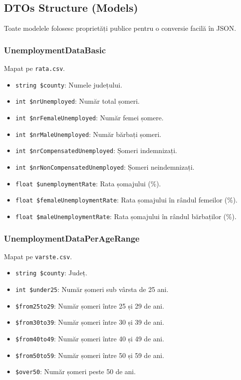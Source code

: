 \documentclass[12pt,a4paper]{article}
\begin{document}
\subsection{DTOs Structure (Models)}
Toate modelele folosesc proprietăți publice pentru o conversie facilă în JSON.

\subsubsection{UnemploymentDataBasic}
Mapat pe \texttt{rata.csv}.
\begin{itemize}
    \item \texttt{string \$county}: Numele județului.
    \item \texttt{int \$nrUnemployed}: Număr total șomeri.
    \item \texttt{int \$nrFemaleUnemployed}: Număr femei șomere.
    \item \texttt{int \$nrMaleUnemployed}: Număr bărbați șomeri.
    \item \texttt{int \$nrCompensatedUnemployed}: Șomeri indemnizați.
    \item \texttt{int \$nrNonCompensatedUnemployed}: Șomeri neindemnizați.
    \item \texttt{float \$unemploymentRate}: Rata șomajului (\%).
    \item \texttt{float \$femaleUnemploymentRate}: Rata șomajului în rândul femeilor (\%).
    \item \texttt{float \$maleUnemploymentRate}: Rata șomajului în rândul bărbaților (\%).
\end{itemize}

\subsubsection{UnemploymentDataPerAgeRange}
Mapat pe \texttt{varste.csv}.
\begin{itemize}
	\item \texttt{string \$county}: Județ.
	\item \texttt{int \$under25}: Număr șomeri sub vârsta de 25 ani. 
	\item \texttt{\$from25to29}: Număr șomeri între 25 și 29 de ani.
	\item \texttt{\$from30to39}: Număr șomeri între 30 și 39 de ani.
	\item \texttt{\$from40to49}: Număr șomeri între 40 și 49 de ani.
	\item \texttt{\$from50to59}: Număr șomeri între 50 și 59 de ani.
	\item \texttt{\$over50}: Număr șomeri peste 50 de ani.
\end{itemize}
\end{document}
